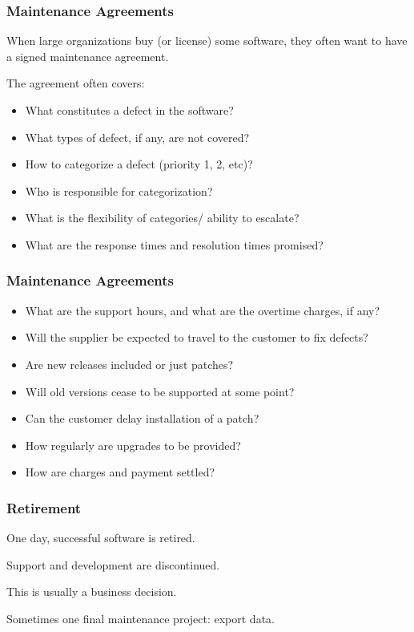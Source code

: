 \begin{frame}
\frametitle{Maintenance Agreements}
\begin{changemargin}{1cm}
When large organizations buy (or license) some software, they often want to have a signed maintenance agreement.

The agreement often covers:
\begin{itemize}
	\item What constitutes a defect in the software?
	\item What types of defect, if any, are not covered?
	\item How to categorize a defect (priority 1, 2, etc)?
	\item Who is responsible for categorization?
	\item What is the flexibility of categories/ ability to escalate?
	\item What are the response times and resolution times promised?
\end{itemize}


\end{changemargin}
\end{frame}

\begin{frame}
\frametitle{Maintenance Agreements}
\begin{changemargin}{1cm}

\begin{itemize}
	\item What are the support hours, and what are the overtime charges, if any?
	\item Will the supplier be expected to travel to the customer to fix defects?
	\item Are new releases included or just patches?
	\item Will old versions cease to be supported at some point?
	\item Can the customer delay installation of a patch?
	\item How regularly are upgrades to be provided?
	\item How are charges and payment settled?
\end{itemize}
\end{changemargin}
\end{frame}

\begin{frame}
\frametitle{Retirement}
\begin{changemargin}{1cm}
One day, successful software is retired.

Support and development are discontinued.

This is usually a business decision.

Sometimes one final maintenance project: export data.

\end{changemargin}
\end{frame}


